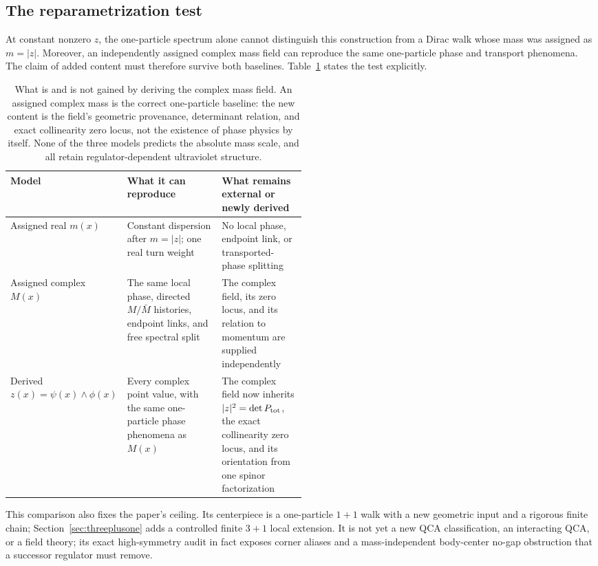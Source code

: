 \documentclass[11pt]{article}
\begin{document}
\subsection*{The reparametrization test}

At constant nonzero $z$, the one-particle spectrum alone cannot distinguish
this construction from a Dirac walk whose mass was assigned as $m=|z|$.
Moreover, an independently assigned complex mass field can reproduce the same
one-particle phase and transport phenomena.  The claim of added content must
therefore survive both baselines.  Table~\ref{tab:reparametrization} states the
test explicitly.

\begin{table}[h]
\centering
\small
\begin{tabularx}{\linewidth}{@{}p{0.18\linewidth}p{0.32\linewidth}X@{}}
\toprule
Model & What it can reproduce & What remains external or newly derived\\
\midrule
Assigned real $m(x)$
 & Constant dispersion after $m=|z|$; one real turn weight
 & No local phase, endpoint link, or transported-phase splitting\\
Assigned complex $M(x)$
 & The same local phase, directed $M/\bar M$ histories, endpoint links, and
 free spectral split
 & The complex field, its zero locus, and its relation to momentum are supplied
 independently\\
Derived $z(x)=\psi(x)\wedge\phi(x)$
 & Every complex point value, with the same one-particle phase phenomena as
 $M(x)$
 & The complex field now inherits $|z|^2=\det P_{\rm tot}$, the exact
 collinearity zero locus, and its orientation from one spinor factorization\\
\bottomrule
\end{tabularx}
\caption{What is and is not gained by deriving the complex mass field.  An
assigned complex mass is the correct one-particle baseline: the new content is
the field's geometric provenance, determinant relation, and exact collinearity
zero locus, not the existence of phase physics by itself.  None of the three
models predicts the absolute mass scale, and all retain regulator-dependent
ultraviolet structure.}
\label{tab:reparametrization}
\end{table}

This comparison also fixes the paper's ceiling.  Its centerpiece is a
one-particle $1+1$ walk with a new geometric input and a rigorous finite chain;
Section~\ref{sec:threeplusone} adds a controlled finite $3+1$ local extension.
It is not yet a new QCA classification, an interacting QCA, or a field theory;
 its exact high-symmetry audit in fact exposes corner aliases and a
 mass-independent body-center no-gap obstruction that a successor regulator
 must remove.
\end{document}
